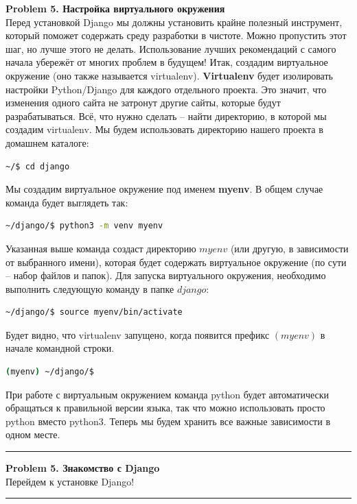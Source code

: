 \documentclass[a4paper, 11pt]{extarticle}
\newenvironment{problem}[2][Problem]
    { \begin{mdframed}[backgroundcolor=gray!20] \textbf{#1 #2} \\}
    {  \end{mdframed}}
\begin{document}
\begin{problem}{5. Настройка виртуального окружения}
Перед установкой Django мы должны установить крайне полезный инструмент, который поможет содержать среду разработки в чистоте. Можно пропустить этот шаг, но лучше этого не делать. Использование лучших рекомендаций с самого начала убережёт от многих проблем в будущем!
Итак, создадим виртуальное окружение (оно также называется virtualenv). \textbf{Virtualenv} будет изолировать настройки Python/Django для каждого отдельного проекта. Это значит, что изменения одного сайта не затронут другие сайты, которые будут разрабатываться. 
Всё, что нужно сделать -- найти директорию, в которой мы создадим virtualenv. 
Мы будем использовать директорию нашего проекта в домашнем каталоге:
\begin{lstlisting}[language=Bash]
~/$ cd django
\end{lstlisting}
Мы создадим виртуальное окружение под именем \textbf{myenv}. В общем случае команда будет выглядеть так:
\begin{lstlisting}[language=Bash]
~/django/$ python3 -m venv myenv
\end{lstlisting}
Указанная выше команда создаст директорию $myenv$ (или другую, в зависимости от выбранного имени), которая будет содержать виртуальное окружение (по сути -- набор файлов и папок).
Для запуска виртуального окружения, необходимо выполнить следующую команду в папке $django$:
\begin{lstlisting}[language=Bash]
~/django/$ source myenv/bin/activate
\end{lstlisting}
Будет видно, что virtualenv запущено, когда появится префикс $(myenv)$ в начале командной строки. 
\begin{lstlisting}[language=Bash]
(myenv) ~/django/$ 
\end{lstlisting}
При работе с виртуальным окружением команда python будет автоматически обращаться к правильной версии языка, так что можно использовать просто python вместо python3.
Теперь мы будем хранить все важные зависимости в одном месте. 
\end{problem}
\noindent\rule{6.257in}{2.8pt}



\begin{problem}{5. Знакомство с Django}
Перейдем к установке Django!
\end{problem}
\noindent\rule{6.257in}{2.8pt}
\end{document}
